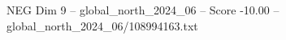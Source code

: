 \begin{textsample}{NEG Dim 9 – global\_north\_2024\_06 – Score -10.00 – global\_north\_2024\_06/108994163.txt}
\end{textsample}
